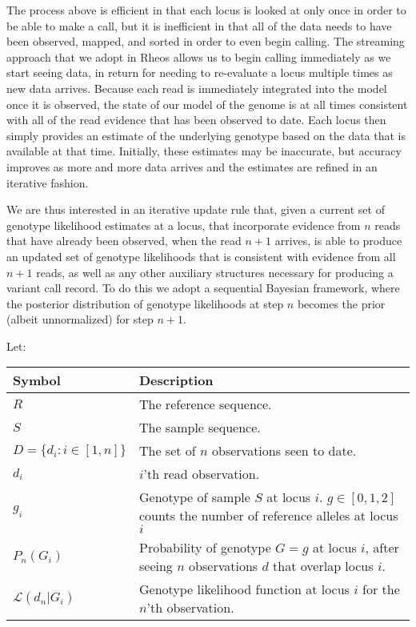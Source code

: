 The process above is efficient in that each locus is looked at only once in order to be able to make a call, but it is inefficient in that all of the data needs to have been observed, mapped, and sorted in order to even begin calling. The streaming approach that we adopt in Rheos allows us to begin calling immediately as we start seeing data, in return for needing to re-evaluate a locus multiple times as new data arrives. Because each read is immediately integrated into the model once it is observed, the state of our model of the genome is at all times consistent with all of the read evidence that has been observed to date. Each locus then simply provides an estimate of the underlying genotype based on the data that is available at that time. Initially, these estimates may be inaccurate, but accuracy improves as more and more data arrives and the estimates are refined in an iterative fashion.   

We are thus interested in an iterative update rule that, given a current set of genotype likelihood estimates at a locus, that incorporate evidence from $n$ reads that have already been observed, when the read $n+1$ arrives, is able to produce an updated set of genotype likelihoods that is consistent with evidence from all $n+1$ reads, as well as any other auxiliary structures necessary for producing a variant call record. To do this we adopt a sequential Bayesian framework, where the posterior distribution of genotype likelihoods at step $n$ becomes the prior (albeit unnormalized) for step $n+1$. 

Let:

\begin{table}[!h]
    \label{tab:snp_calling_notation}
    {\begin{tabular}{lp{9.5cm}}
    \toprule
    Symbol & Description \\
    \midrule
    $R$ & The reference sequence. \\
    $S$ & The sample sequence. \\
    $D = \{d_i: i \in [1,n]\}$ & The set of $n$ observations seen to date. \\ 
    $d_i$ & $i$'th read observation. \\
    $g_{i}$ & Genotype of sample $S$ at locus $i$. $g \in [0,1,2]$ counts the number of reference alleles at locus $i$\\
    $P_n(G_i)$ & Probability of genotype $G = g$ at locus $i$, after seeing $n$ observations $d$ that overlap locus $i$.\\
    $\mathcal{L}(d_n|G_i)$ & Genotype likelihood function at locus $i$ for the $n$'th observation.\\
    \bottomrule
    \end{tabular}}
\end{table}

